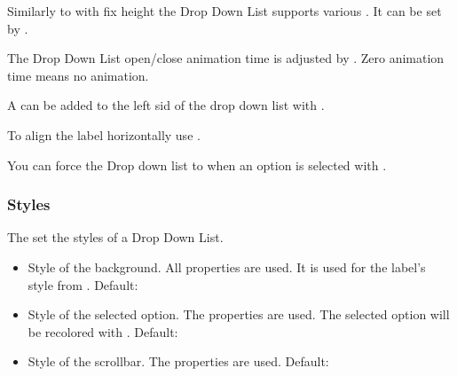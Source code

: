 \documentclass[letterpaper,10pt,english]{sphinxmanual}
\begin{document}
Similarly to {\hyperref[\detokenize{object-types/page::doc}]{}} with fix height the Drop Down List supports various . It can be set by .

The Drop Down List open/close animation time is adjusted by . Zero animation time means no animation.

A  can be added to the left sid of the drop down list with .

To align the label horizontally use .

You can force the Drop down list to  when an option is selected with .


\subsubsection{Styles}
\label{\detokenize{object-types/ddlist:styles}}
The  set the styles of a Drop Down List.
\begin{itemize}
\item {} 
 Style of the background. All  properties are used. It is used for the label’s style from . Default: 

\item {} 
 Style of the selected option.  The  properties are used. The selected option will be recolored with . Default: 

\item {} 
 Style of the scrollbar. The  properties are used. Default: 

\end{itemize}
\end{document}
